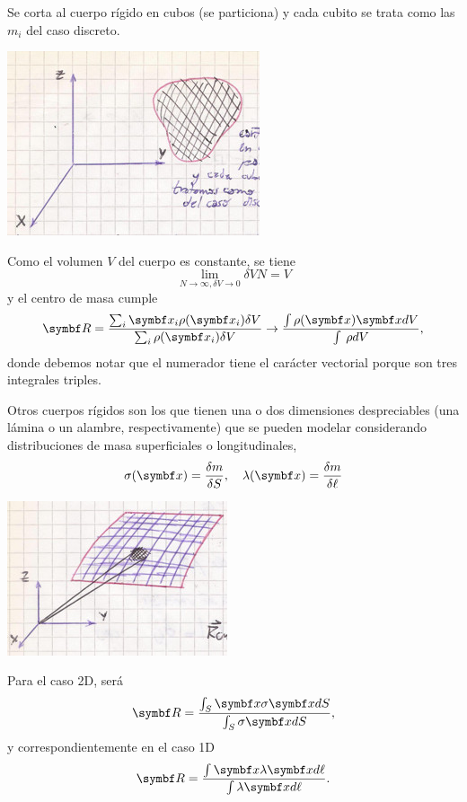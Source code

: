 \documentclass[10pt,oneside]{CBFT_book}
\begin{document}

Se corta al cuerpo rígido en cubos (se particiona) y cada cubito se trata como las $m_i$ del caso discreto.

\includegraphics[scale=0.4]{images/fig_mc_rigid_body_3.jpg}

Como el volumen $V$ del cuerpo es constante, se tiene 
\[
	\lim_{N\to\infty,\delta V\to 0} \delta V N = V
\]
y el centro de masa cumple 
\[
	\vb{R} = \frac{\sum_i \vb{x}_i \rho(\vb{x}_i) \delta V }{\sum_i \rho(\vb{x}_i) \delta V}  \to 
	\frac{\int \rho(\vb{x}) \vb{x} dV }{\int \: \rho dV}, 
\]
donde debemos notar que el numerador tiene el carácter vectorial porque son tres integrales triples.

Otros cuerpos rígidos son los que tienen una o dos dimensiones despreciables (una lámina o un alambre, respectivamente)
que se pueden modelar considerando distribuciones de masa superficiales o longitudinales,
\[
	\sigma(\vb{x}) = \frac{\delta m}{\delta S}, \quad \lambda(\vb{x}) = \frac{\delta m}{\delta \ell}
\]

\includegraphics[scale=0.4]{images/fig_mc_rigid_body_4.jpg}

Para el caso 2D, será
\[
	\vb{R} = \frac{ \int_S \vb{x} \sigma{\vb{x}} dS }{ \int_S \sigma{\vb{x}} dS },
\]
y correspondientemente en el caso 1D
\[
	\vb{R} = \frac{ \int \vb{x} \lambda{\vb{x}} d\ell }{ \int \lambda{\vb{x}} d\ell }.
\]
\end{document}
